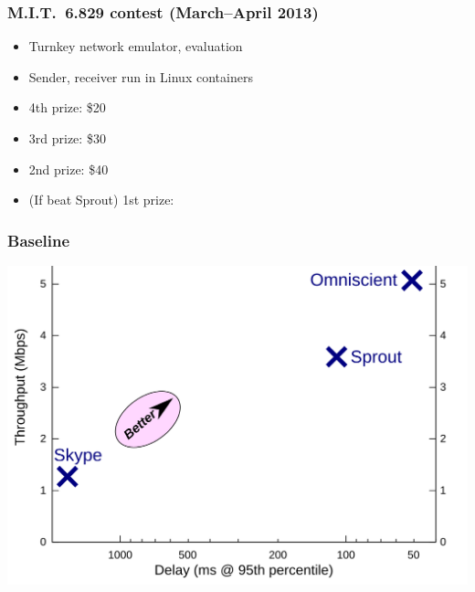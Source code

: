 \documentclass[svgnames]{beamer}
\begin{document}
\begin{frame}
\frametitle{M.I.T.~6.829 contest (March--April 2013)}

\begin{itemize}
\item Turnkey network emulator, evaluation

\item Sender, receiver run in Linux containers

\item 4th prize: \$20

\item 3rd prize: \$30

\item 2nd prize: \$40

\item (If beat Sprout) 1st prize: \pause {\color{DarkBlue}{\bf Co-authorship on future paper}}

\end{itemize}

\end{frame}

\begin{frame}
\frametitle{Baseline}

\begin{centering}
\includegraphics[width=0.9\columnwidth]{pointplot-nostudents.png}

\end{centering}

\end{frame}
\end{document}
